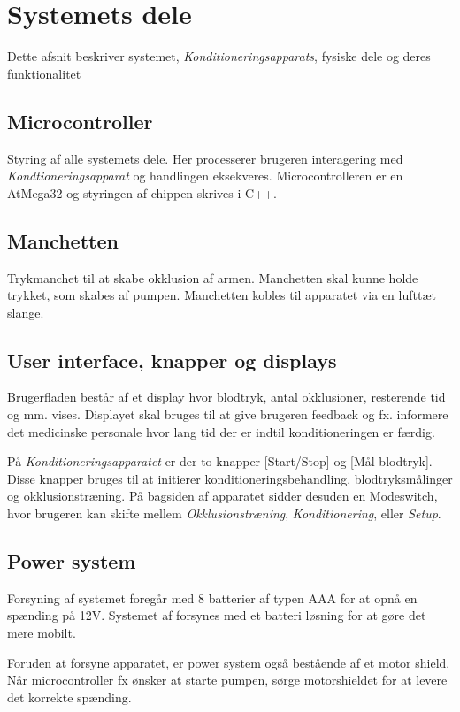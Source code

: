 \chapter{Systemets dele}
Dette afsnit beskriver systemet, \textit{Konditioneringsapparats}, fysiske dele og deres funktionalitet

\section{Microcontroller}
Styring af alle systemets dele. Her processerer brugeren interagering med \textit{Kondtioneringsapparat} og handlingen eksekveres. Microcontrolleren er en AtMega32 og styringen af chippen skrives i C++.

\section{Manchetten}
Trykmanchet til at skabe okklusion af armen. Manchetten skal kunne holde trykket, som skabes af pumpen. Manchetten kobles til apparatet via en lufttæt slange. 

\section{User interface, knapper og displays}
Brugerfladen består af et display hvor blodtryk, antal okklusioner, resterende tid og mm. vises. Displayet skal bruges til at give brugeren feedback og fx. informere det medicinske personale hvor lang tid der er indtil konditioneringen er færdig. 

På \textit{Konditioneringsapparatet} er der to knapper [Start/Stop] og [Mål blodtryk]. Disse knapper bruges til at initierer konditioneringsbehandling, blodtryksmålinger og okklusionstræning. På bagsiden af apparatet sidder desuden en Modeswitch, hvor brugeren kan skifte mellem \textit{Okklusionstræning}, \textit{Konditionering}, eller \textit{Setup}. 

\section{Power system}
Forsyning af systemet foregår med 8 batterier af typen AAA for at opnå en spænding på 12V. Systemet af forsynes med et batteri løsning for at gøre det mere mobilt.  

Foruden at forsyne apparatet, er power system også bestående af et motor shield. Når microcontroller fx ønsker at starte pumpen, sørge motorshieldet for at levere det korrekte spænding. 

